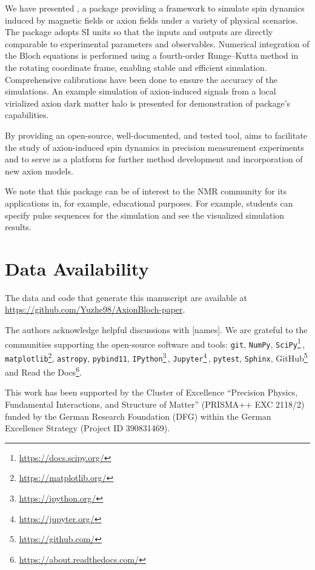 \documentclass[%
 reprint,
nofootinbib,
 amsmath,amssymb,
 aps,
]{revtex4-2}
\begin{document}
We have presented \axionbloch{}, a package providing a framework to simulate spin dynamics induced by magnetic fields or axion fields under a variety of physical scenarios. 
The package adopts SI units so that the inputs and outputs are directly comparable to experimental parameters and observables. 
Numerical integration of the Bloch equations is performed using a fourth-order Runge--Kutta method in the rotating coordinate frame, enabling stable and efficient simulation. 
Comprehensive calibrations have been done to ensure the accuracy of the simulations. 
An example simulation of axion-induced signals from a local virialized axion dark matter halo is presented for demonstration of package's capabilities. 

By providing an open-source, well-documented, and tested tool, \axionbloch{} aims to facilitate the study of axion-induced spin dynamics in precision measurement experiments and to serve as a platform for further method development and incorporation of new axion models.

We note that this package can be of interest to the NMR community for its applications in, for example, educational purposes. 
For example, students can specify pulse sequences for the simulation and see the visualized simulation results. 

\section*{Data Availability}
\label{sec:data-availability}
The data and code that generate this manuscript are available at \url{
https://github.com/Yuzhe98/AxionBloch-paper}. 

\begin{acknowledgments}

The authors acknowledge helpful discussions with [names]. 
We are grateful to the communities supporting the open-source software and tools: \texttt{git}, \texttt{NumPy}, 
\texttt{SciPy}\footnote{\url{https://docs.scipy.org/}}\,\cite{Virtanen2020_SciPy}, 
\texttt{matplotlib}\footnote{\url{https://matplotlib.org/}}, 
\texttt{astropy}, 
\texttt{pybind11}, 
\texttt{IPython}\footnote{\url{https://ipython.org/}}\,\cite{Perez2007_IPython}, 
\texttt{Jupyter}\footnote{\url{https://jupyter.org/}}\,\cite{Granger2021_Jupyter}, 
\texttt{pytest}, 
\texttt{Sphinx}, 
GitHub\footnote{\url{https://github.com/}} 
and 
Read the Docs\footnote{\url{https://about.readthedocs.com/}}. 

This work has been supported by the Cluster of Excellence ``Precision Physics, Fundamental Interactions, and Structure of Matter'' (PRISMA++ EXC 2118/2) funded by the
German Research Foundation (DFG) within the German Excellence Strategy (Project ID 390831469).

\end{acknowledgments}
\end{document}
